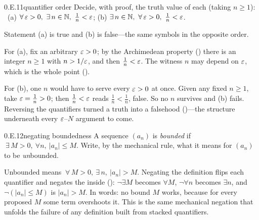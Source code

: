 \documentclass[main.tex]{subfiles}
\begin{document}
\begin{Exercise}{0.E.11}{quantifier order}
Decide, with proof, the truth value of each (taking $n\ge1$): \ (a) $\forall\,\varepsilon>0,\
\exists\,n\in\mathbb N,\ \tfrac1n<\varepsilon$; \quad (b) $\exists\,n\in\mathbb N,\ \forall\,\varepsilon>0,\
\tfrac1n<\varepsilon$.
\end{Exercise}
\begin{Solution}
Statement (a) is true and (b) is false---the same symbols in the opposite order.

For (a), fix an arbitrary $\varepsilon>0$; by the Archimedean property (\xrefL{1.7}) there is an integer
$n\ge1$ with $n>1/\varepsilon$, and then $\tfrac1n<\varepsilon$. The witness $n$ may depend on $\varepsilon$, which is the
whole point (\xref{0.2.8}).

For (b), one $n$ would have to serve every $\varepsilon>0$ at once. Given any fixed $n\ge1$, take
$\varepsilon=\tfrac1n>0$; then $\tfrac1n<\varepsilon$ reads $\tfrac1n<\tfrac1n$, false. So no $n$ survives and (b)
fails. Reversing the quantifiers turned a truth into a falsehood (\xref{0.2.7})---the structure
underneath every $\varepsilon$--$N$ argument to come.
\end{Solution}

\begin{Exercise}{0.E.12}{negating boundedness}
A sequence $(a_n)$ is \emph{bounded} if $\ \exists\,M>0,\ \forall n,\ |a_n|\le M$. Write, by the
mechanical rule, what it means for $(a_n)$ to be \emph{un}bounded.
\end{Exercise}
\begin{Solution}
Unbounded means $\ \forall\,M>0,\ \exists\,n,\ |a_n|>M$. Negating the definition flips each quantifier
and negates the inside (): $\neg\exists M$ becomes $\forall M$, $\neg\forall n$ becomes
$\exists n$, and $\neg(|a_n|\le M)$ is $|a_n|>M$. In words: no bound $M$ works, because for every
proposed $M$ some term overshoots it. This is the same mechanical negation that unfolds the failure of
any definition built from stacked quantifiers.
\end{Solution}

\par\bigskip{}\par\nobreak\smallskip
\end{document}
